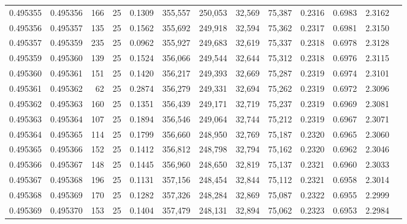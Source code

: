 \begin{tabular}{rrrrrrrrrrrrr}
0.495355 & 0.495356 &   166 &  25 &                                     0.1309 & 355,557 & 250,053 &  32,569 &  75,387 & 0.2316 & 0.6983 & 2.3162 \\
0.495356 & 0.495357 &   135 &  25 &                                     0.1562 & 355,692 & 249,918 &  32,594 &  75,362 & 0.2317 & 0.6981 & 2.3150 \\
0.495357 & 0.495359 &   235 &  25 &                                     0.0962 & 355,927 & 249,683 &  32,619 &  75,337 & 0.2318 & 0.6978 & 2.3128 \\
0.495359 & 0.495360 &   139 &  25 &                                     0.1524 & 356,066 & 249,544 &  32,644 &  75,312 & 0.2318 & 0.6976 & 2.3115 \\
0.495360 & 0.495361 &   151 &  25 &                                     0.1420 & 356,217 & 249,393 &  32,669 &  75,287 & 0.2319 & 0.6974 & 2.3101 \\
0.495361 & 0.495362 &    62 &  25 &                                     0.2874 & 356,279 & 249,331 &  32,694 &  75,262 & 0.2319 & 0.6972 & 2.3096 \\
0.495362 & 0.495363 &   160 &  25 &                                     0.1351 & 356,439 & 249,171 &  32,719 &  75,237 & 0.2319 & 0.6969 & 2.3081 \\
0.495363 & 0.495364 &   107 &  25 &                                     0.1894 & 356,546 & 249,064 &  32,744 &  75,212 & 0.2319 & 0.6967 & 2.3071 \\
0.495364 & 0.495365 &   114 &  25 &                                     0.1799 & 356,660 & 248,950 &  32,769 &  75,187 & 0.2320 & 0.6965 & 2.3060 \\
0.495365 & 0.495366 &   152 &  25 &                                     0.1412 & 356,812 & 248,798 &  32,794 &  75,162 & 0.2320 & 0.6962 & 2.3046 \\
0.495366 & 0.495367 &   148 &  25 &                                     0.1445 & 356,960 & 248,650 &  32,819 &  75,137 & 0.2321 & 0.6960 & 2.3033 \\
0.495367 & 0.495368 &   196 &  25 &                                     0.1131 & 357,156 & 248,454 &  32,844 &  75,112 & 0.2321 & 0.6958 & 2.3014 \\
0.495368 & 0.495369 &   170 &  25 &                                     0.1282 & 357,326 & 248,284 &  32,869 &  75,087 & 0.2322 & 0.6955 & 2.2999 \\
0.495369 & 0.495370 &   153 &  25 &                                     0.1404 & 357,479 & 248,131 &  32,894 &  75,062 & 0.2323 & 0.6953 & 2.2984 \\

\end{tabular}
